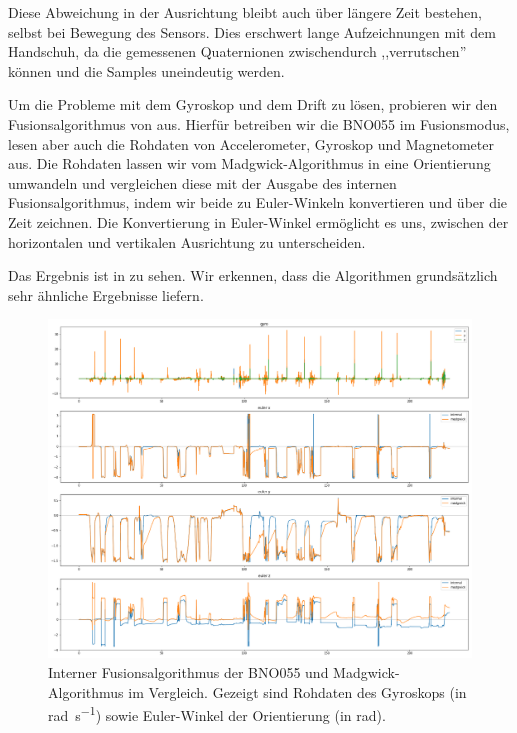 Diese Abweichung in der Ausrichtung bleibt auch über längere Zeit bestehen,
selbst bei Bewegung des Sensors. Dies erschwert lange Aufzeichnungen mit dem
Handschuh, da die gemessenen Quaternionen zwischendurch ,,verrutschen'' können
und die Samples uneindeutig werden.

Um die Probleme mit dem Gyroskop und dem Drift zu lösen, probieren wir den
Fusionsalgorithmus von \citet{madgwick} aus. Hierfür betreiben wir die BNO055
im Fusionsmodus, lesen aber auch die Rohdaten von Accelerometer, Gyroskop und
Magnetometer aus. Die Rohdaten lassen wir vom Madgwick-Algorithmus in eine
Orientierung umwandeln und vergleichen diese mit der Ausgabe des internen
Fusionsalgorithmus, indem wir beide zu Euler-Winkeln konvertieren und über die
Zeit zeichnen. Die Konvertierung in Euler-Winkel ermöglicht es uns, zwischen
der horizontalen und vertikalen Ausrichtung zu unterscheiden.

Das Ergebnis ist in  zu sehen. Wir erkennen, dass die
Algorithmen grundsätzlich sehr ähnliche Ergebnisse liefern.

\begin{figure}
    \includegraphics[width=\textwidth]{../data/heading/heading}
    \caption[Interner Fusionsalgorithmus der BNO055 und Madgwick-Algorithmus im
    Vergleich]{Interner Fusionsalgorithmus der BNO055 und Madgwick-Algorithmus
    im Vergleich. Gezeigt sind Rohdaten des Gyroskops (in
    \si{\radian\per\second}) sowie Euler-Winkel der
    Orientierung (in \si{\radian}).}
\end{figure}

